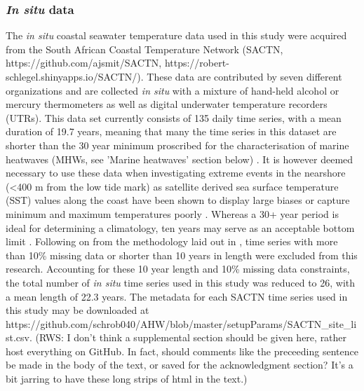 \documentclass[a4paper,10pt,review]{elsarticle}
\begin{document}
\subsubsection{\emph{In situ} data}
The \emph{in situ} coastal seawater temperature data used in this study were acquired from the South African Coastal Temperature Network (SACTN, https://github.com/ajsmit/SACTN, https://robert-schlegel.shinyapps.io/SACTN/). These data are contributed by seven different organizations and are collected \emph{in situ} with a mixture of hand-held alcohol or mercury thermometers as well as digital underwater temperature recorders (UTRs). This data set currently consists of 135 daily time series, with a mean duration of 19.7 years, meaning that many the time series in this dataset are shorter than the 30 year minimum proscribed for the characterisation of marine heatwaves (MHWs, see 'Marine heatwaves' section below) \citep{Hobday2016}. It is however deemed necessary to use these data when investigating extreme events in the nearshore (<400 m from the low tide mark) as satellite derived sea surface temperature (SST) values along the coast have been shown to display large biases \citep{Smit2013} or capture minimum and maximum temperatures poorly \citep{Smale2009, Castillo2010}. Whereas a 30+ year period is ideal for determining a climatology, ten years may serve as an acceptable bottom limit \citep{Schlegel2017}. Following on from the methodology laid out in \citet{Schlegel2017}, time series with more than 10\% missing data or shorter than 10 years in length were excluded from this research. Accounting for these 10 year length and 10\% missing data constraints, the total number of \emph{in situ} time series used in this study was reduced to 26, with a mean length of 22.3 years. The metadata for each SACTN time series used in this study may be downloaded at https://github.com/schrob040/AHW/blob/master/setupParams/SACTN\_site\_list.csv.
(RWS: I don't think a supplemental section should be given here, rather host everything on GitHub. In fact, should comments like the preceeding sentence be made in the body of the text, or saved for the acknowledgment section? It's a bit jarring to have these long strips of html in the text.)
\end{document}
